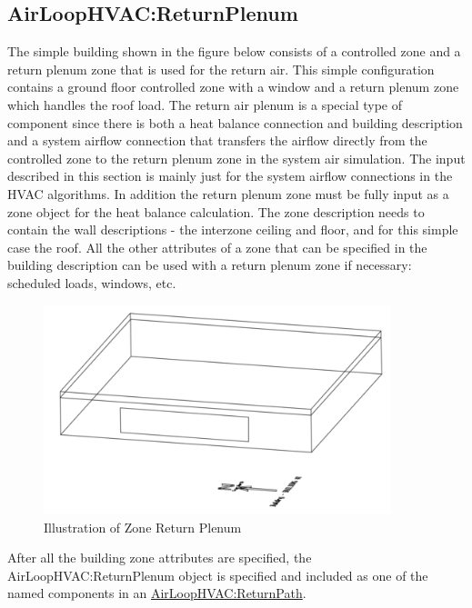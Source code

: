 \subsection{AirLoopHVAC:ReturnPlenum}\label{airloophvacreturnplenum}

The simple building shown in the figure below consists of a controlled zone and a return plenum zone that is used for the return air. This simple configuration contains a ground floor controlled zone with a window and a return plenum zone which handles the roof load. The return air plenum is a special type of component since there is both a heat balance connection and building description and a system airflow connection that transfers the airflow directly from the controlled zone to the return plenum zone in the system air simulation. The input described in this section is mainly just for the system airflow connections in the HVAC algorithms. In addition the return plenum zone must be fully input as a zone object for the heat balance calculation. The zone description needs to contain the wall descriptions - the interzone ceiling and floor, and for this simple case the roof. All the other attributes of a zone that can be specified in the building description can be used with a return plenum zone if necessary: scheduled loads, windows, etc.

\begin{figure}[hbtp] %
\centering
\includegraphics[width=0.9\textwidth, height=0.9\textheight, keepaspectratio=true]{media/image337.png}
\caption{Illustration of Zone Return Plenum \protect \label{fig:illustration-of-zone-return-plenum}}
\end{figure}

After all the building zone attributes are specified, the AirLoopHVAC:ReturnPlenum object is specified and included as one of the named components in an \hyperref[airloophvacreturnpath]{AirLoopHVAC:ReturnPath}.

